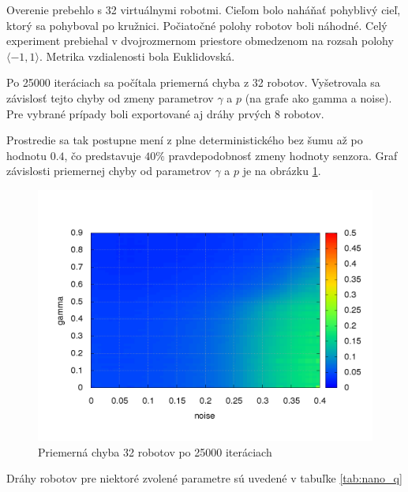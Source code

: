 Overenie prebehlo s 32 virtuálnymi robotmi. Cieľom bolo naháňať pohyblivý cieľ,
ktorý sa pohyboval po kružnici. Počiatočné polohy robotov boli náhodné.
Celý experiment prebiehal v dvojrozmernom priestore obmedzenom na rozsah
polohy $\langle -1, 1 \rangle$. Metrika vzdialenosti bola Euklidovská.

Po 25000 iteráciach sa počítala priemerná chyba z 32 robotov. Vyšetrovala
sa závislosť tejto chyby od zmeny parametrov $\gamma$ a $p$ (na grafe ako gamma a noise).
Pre vybrané prípady boli exportované aj dráhy prvých 8 robotov.

Prostredie sa tak postupne mení z plne deterministického bez šumu až po hodnotu $0.4$,
čo predstavuje $40\%$ pravdepodobnosť zmeny hodnoty senzora. Graf závislosti priemernej chyby
od parametrov $\gamma$ a $p$ je na obrázku \ref{img:nano_q_summary}.

\begin{figure}[!htb]
\centering
\includegraphics[scale=.4]{../../results_q_learning/nano_q_learning/summary_result_average_error_map.png}
\caption{Priemerná chyba 32 robotov po 25000 iteráciach}
\label{img:nano_q_summary}
\end{figure}

Dráhy robotov pre niektoré zvolené parametre sú uvedené v tabuľke \ref{tab:nano_q}

